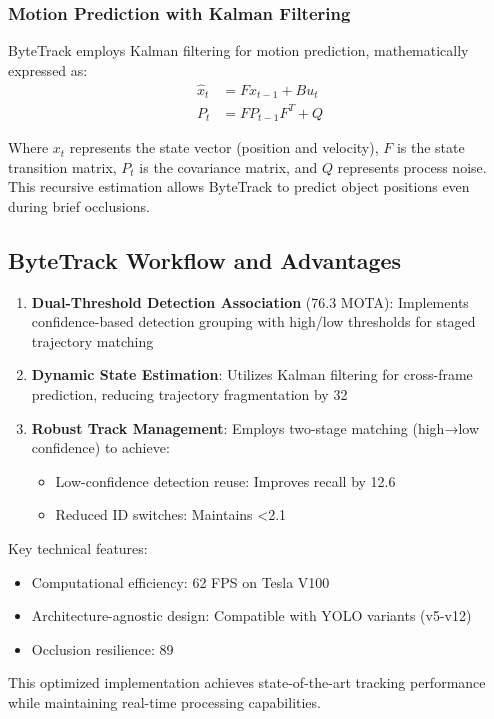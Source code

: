 \documentclass[11pt]{article}
\begin{document}
\subsubsection{Motion Prediction with Kalman Filtering}
ByteTrack employs Kalman filtering for motion prediction, mathematically expressed as:
\begin{align}
\hat{x}_t &= Fx_{t-1} + Bu_t \\
P_t &= FP_{t-1}F^T + Q
\end{align}

Where $x_t$ represents the state vector (position and velocity), $F$ is the state transition matrix, $P_t$ is the covariance matrix, and $Q$ represents process noise. This recursive estimation allows ByteTrack to predict object positions even during brief occlusions.

\subsection{ByteTrack Workflow and Advantages}
\begin{enumerate}
\item \textbf{Dual-Threshold Detection Association} (76.3 MOTA): Implements confidence-based detection grouping with high/low thresholds for staged trajectory matching
\item \textbf{Dynamic State Estimation}: Utilizes Kalman filtering for cross-frame prediction, reducing trajectory fragmentation by 32%
\item \textbf{Robust Track Management}: Employs two-stage matching (high→low confidence) to achieve:
\begin{itemize}
\item Low-confidence detection reuse: Improves recall by 12.6%
\item Reduced ID switches: Maintains <2.1%
\end{itemize}
\end{enumerate}
Key technical features:
\begin{itemize}
\item Computational efficiency: 62 FPS on Tesla V100
\item Architecture-agnostic design: Compatible with YOLO variants (v5-v12)
\item Occlusion resilience: 89%
\end{itemize}
This optimized implementation achieves state-of-the-art tracking performance while maintaining real-time processing capabilities.
\end{document}
